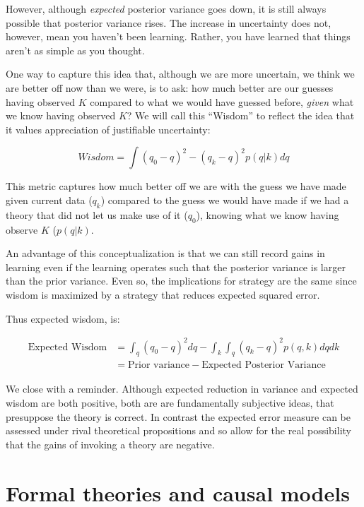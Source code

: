 \documentclass[
  12pt,
]{book}
\begin{document}
However, although \emph{expected} posterior variance goes down, it is still always possible that posterior variance rises. The increase in uncertainty does not, however, mean you haven't been learning. Rather, you have learned that things aren't as simple as you thought.

One way to capture this idea that, although we are more uncertain, we think we are better off now than we were, is to ask: how much better are our guesses having observed \(K\) compared to what we would have guessed before, \emph{given} what we know having observed \(K\)? We will call this ``Wisdom'' to reflect the idea that it values appreciation of justifiable uncertainty:

\[Wisdom  = \int(q_0 - q)^2 - (q_k - q)^2 p(q | k)dq\]

This metric captures how much better off we are with the guess we have made given current data (\(q_k\)) compared to the guess we would have made if we had a theory that did not let us make use of it (\(q_0\)), knowing what we know having observe \(K\) (\(p(q|k)\).

An advantage of this conceptualization is that we can still record gains in learning even if the learning operates such that the posterior variance is larger than the prior variance. Even so, the implications for strategy are the same since wisdom is maximized by a strategy that reduces expected squared error.

Thus expected wisdom, is:

\begin{align}
\text{Expected Wisdom}  &= \int_q(q_0 - q)^2dq - \int_k\int_q(q_k - q)^2 p(q, k)dqdk \\
&= \text{Prior variance} - \text{Expected Posterior Variance}
\end{align}

We close with a reminder. Although expected reduction in variance and expected wisdom are both positive, both are are fundamentally subjective ideas, that presuppose the theory is correct. In contrast the expected error measure can be assessed under rival theoretical propositions and so allow for the real possibility that the gains of invoking a theory are negative.

\hypertarget{formal-theories-and-causal-models}{%
\section{Formal theories and causal models}\label{formal-theories-and-causal-models}}
\end{document}
